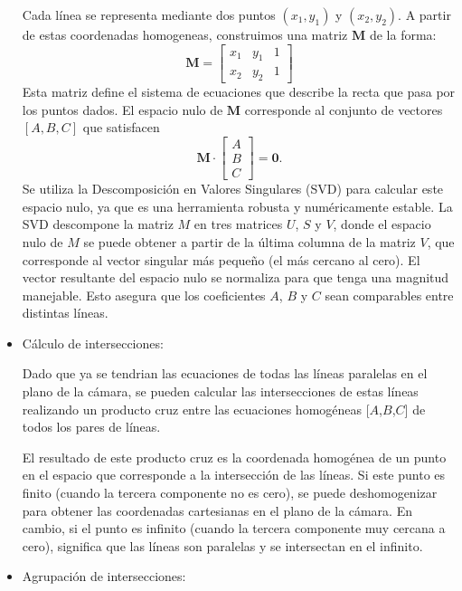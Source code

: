 \begin{itemize}
    Cada línea se representa mediante dos puntos $(x_1, y_1)$ y $(x_2, y_2)$. A partir de estas coordenadas homogeneas, construimos una matriz $\mathbf{M}$ de la forma:
    \[
        \mathbf{M} = \begin{bmatrix}
                x_1 & y_1 & 1 \\
                x_2 & y_2 & 1
        \end{bmatrix}
    \]
    Esta matriz define el sistema de ecuaciones que describe la recta que pasa por los puntos dados.
    El espacio nulo de $\mathbf{M}$ corresponde al conjunto de vectores $[A,B,C]$ que satisfacen
    \[
        \mathbf{M} \cdot \begin{bmatrix}
                    A \\ B \\ C
        \end{bmatrix} = \mathbf{0}.
    \]
    Se utiliza la Descomposición en Valores Singulares (SVD) para calcular este espacio nulo, ya que es una herramienta robusta y numéricamente estable.
    La SVD descompone la matriz \(M\) en tres matrices \(U\), \(S\) y \(V\), donde el espacio nulo de \(M\) se puede obtener a partir de la última columna de la matriz \(V\), que corresponde al vector singular más pequeño (el más cercano al cero).
    El vector resultante del espacio nulo se normaliza para que tenga una magnitud manejable. Esto asegura que los coeficientes \(A\), \(B\) y \(C\) sean comparables entre distintas líneas.

    \item Cálculo de intersecciones:

    Dado que ya se tendrian las ecuaciones de todas las líneas paralelas en el plano de la cámara, se pueden calcular las intersecciones de estas líneas realizando un producto cruz entre las ecuaciones homogéneas [\(A\),\(B\),\(C\)] de todos los pares de líneas.
    
    El resultado de este producto cruz es la coordenada homogénea de un punto en el espacio que corresponde a la intersección de las líneas.
    Si este punto es finito (cuando la tercera componente no es cero), se puede deshomogenizar para obtener las coordenadas cartesianas en el plano de la cámara.
    En cambio, si el punto es infinito (cuando la tercera componente muy cercana a cero), significa que las líneas son paralelas y se intersectan en el infinito.


    \item  Agrupación de intersecciones:


\end{itemize}
